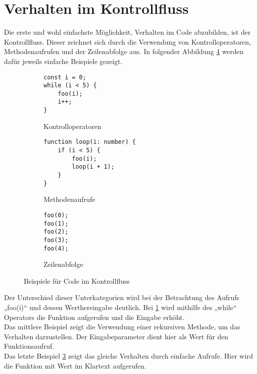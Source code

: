 \section{Verhalten im Kontrollfluss}
Die erste und wohl einfachste Möglichkeit, Verhalten im Code abzubilden, ist der Kontrollfluss. Dieser zeichnet sich durch die Verwendung von Kontrolloperatoren, Methodenaufrufen und der Zeilenabfolge aus. \citep[S. 313 f.]{fiveLines.2023}
In folgender Abbildung \ref{fig:Kontrollfluss} werden dafür jeweils einfache Beispiele gezeigt.
\begin{figure}[ht]
    \begin{subfigure}[t]{0.30\textwidth}
        \centering
        \begin{minipage}[t]{\linewidth}
            \begin{verbatim}
const i = 0;
while (i < 5) {
    foo(i);
    i++;
}
            \end{verbatim}
        \end{minipage}
        \caption{Kontrolloperatoren}
        \label{fig:Kontrolloperatoren}
    \end{subfigure}
    \hfill
    \begin{subfigure}[t]{0.30\textwidth}
        \centering
        \begin{minipage}[t]{\linewidth}
            \begin{verbatim}
function loop(i: number) {
    if (i < 5) {
        foo(i);
        loop(i + 1);
    }
}
            \end{verbatim}
        \end{minipage}
        \caption{Methodenaufrufe}
        \label{fig:Methodenaufrufe}
    \end{subfigure}
    \hfill
    \begin{subfigure}[t]{0.30\textwidth}
        \centering
        \begin{minipage}[t]{\linewidth}
            \begin{verbatim}
foo(0);
foo(1);
foo(2);
foo(3);
foo(4);
            \end{verbatim}
        \end{minipage}
        \caption{Zeilenabfolge}
        \label{fig:Zeilenabfolge}
    \end{subfigure}
    \caption{Beispiele für Code im Kontrollfluss \cite{fiveLines.2023}}
    \label{fig:Kontrollfluss}
\end{figure}

Der Unterschied dieser Unterkategorien wird bei der Betrachtung des Aufrufs „foo(i)“ und dessen Werthereingabe deutlich. Bei \ref{fig:Kontrolloperatoren} wird mithilfe des „while“ Operators die Funktion aufgerufen und die Eingabe erhöht.\\ Das mittlere Beispiel zeigt die Verwendung einer rekursiven Methode, um das Verhalten darzustellen. Der Eingabeparameter dient hier als Wert für den Funktionsaufruf.\\ Das letzte Beispiel \ref{fig:Zeilenabfolge} zeigt das gleiche Verhalten durch einfache Aufrufe. Hier wird die Funktion mit Wert im Klartext aufgerufen.

